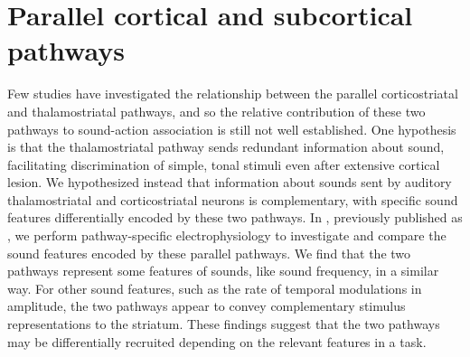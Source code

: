 \section{Parallel cortical and subcortical pathways}

Few studies have investigated the relationship between the parallel corticostriatal and thalamostriatal pathways, and so the relative contribution of these two pathways to sound-action association is still not well established.
One hypothesis is that the thalamostriatal pathway sends redundant information about sound, facilitating discrimination of simple, tonal stimuli even after extensive cortical lesion.
We hypothesized instead that information about sounds sent by auditory thalamostriatal and corticostriatal neurons is complementary, with specific sound features differentially encoded by these two pathways.
In \ch{\Thstr}, previously published as \citet{Ponvert2019}, we perform pathway-specific electrophysiology to investigate and compare the sound features encoded by these parallel pathways.
%
We find that the two pathways represent some features of sounds, like sound frequency, in a similar way.
%
For other sound features, such as the rate of temporal modulations in amplitude, the two pathways appear to convey complementary stimulus representations to the striatum.
%
These findings suggest that the two pathways may be differentially recruited depending on the relevant features in a task. 

